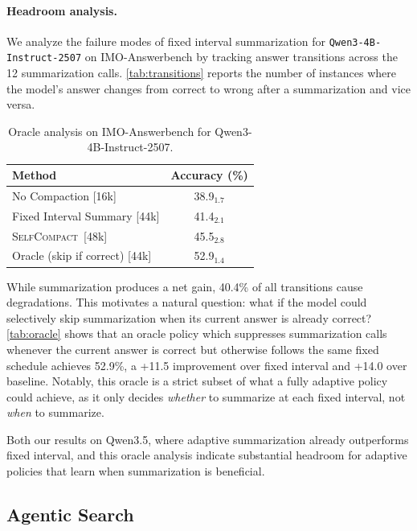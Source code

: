 \documentclass{article}
\newcommand{\method}{\textsc{{SelfCompact}}}
\begin{document}
\paragraph{Headroom analysis.} We analyze the failure modes of fixed interval summarization for \texttt{Qwen3-4B-Instruct-2507} on IMO-Answerbench by tracking answer transitions across the 12 summarization calls. \autoref{tab:transitions} reports the number of instances where the model's answer changes from correct to wrong after a summarization and vice versa.



\begin{table}
\vspace{-10pt}
\centering
\small
\caption{Oracle analysis on IMO-Answerbench for Qwen3-4B-Instruct-2507.}
\label{tab:oracle}
\begin{tabular}{lc}
\toprule
Method & Accuracy (\%) \\
\midrule
No Compaction [16k] & 38.9$_{1.7}$ \\
Fixed Interval Summary [44k] & 41.4$_{2.1}$ \\
\method~[48k] & 45.5$_{2.8}$ \\
Oracle (skip if correct) [44k] & 52.9$_{1.4}$ \\
\bottomrule
\end{tabular}
\end{table}
While summarization produces a net gain, 40.4\% of all transitions cause degradations. This motivates a natural question: what if the model could selectively skip summarization when its current answer is already correct? \autoref{tab:oracle} shows that an oracle policy which suppresses summarization calls whenever the current answer is correct but otherwise follows the same fixed schedule achieves 52.9\%, a +11.5 improvement over fixed interval and +14.0 over baseline. Notably, this oracle is a strict subset of what a fully adaptive policy could achieve, as it only decides \emph{whether} to summarize at each fixed interval, not \emph{when} to summarize.


Both our results on Qwen3.5, where adaptive summarization already outperforms fixed interval, and this oracle analysis indicate substantial headroom for adaptive policies that learn when summarization is beneficial.

\subsection{Agentic Search}
\label{subsec:agentic-search}
\end{document}
